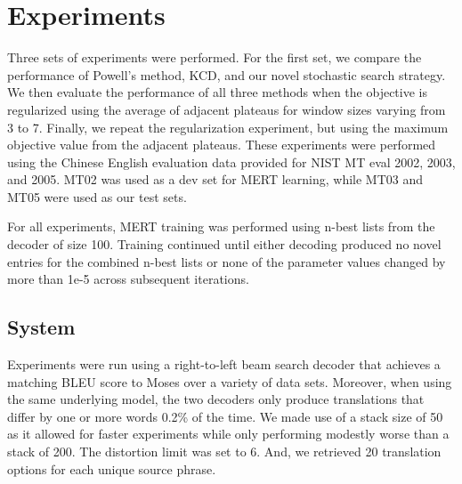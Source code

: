 \documentclass[11pt,tightenlines,kern-1pt]{article}
\begin{document}

\section{Experiments}

Three sets of experiments were performed. For the first set, we compare the performance of Powell's method, KCD, and our novel stochastic search strategy. We then evaluate the performance of all three methods when the objective is regularized using the average of adjacent plateaus for window sizes varying from 3 to 7. Finally, we repeat the regularization experiment, but using the maximum objective value from the adjacent plateaus. These experiments were performed using the Chinese English evaluation data provided for NIST MT eval 2002, 2003, and 2005. MT02 was used as a dev set for MERT learning, while MT03 and MT05 were used as our test sets. 

For all experiments, MERT training was performed using n-best lists from the decoder of size 100. Training continued until either decoding produced no novel entries for the combined n-best lists or none of the parameter values changed by more than 1e-5 across subsequent iterations.

\subsection{System}

Experiments were run using a right-to-left beam search decoder that achieves a matching BLEU score to Moses \cite{koehn2007} over a variety of data sets. Moreover, when using the same underlying model, the two decoders only produce translations that differ by one or more words 0.2\% of the time. We made use of a stack size of 50 as it allowed for faster experiments while only performing modestly worse than a stack of 200. The distortion limit was set to 6. And, we retrieved 20 translation options for each unique source phrase.
\end{document}
